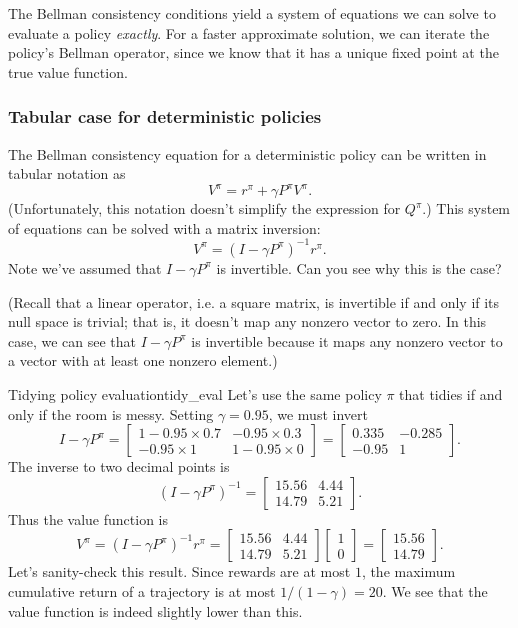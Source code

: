 \documentclass[../main/main]{subfiles}
\begin{document}
The Bellman consistency conditions yield a system of equations we can solve to evaluate a policy \emph{exactly}. For a faster approximate solution, we can iterate the policy's Bellman operator, since we know that it has a unique fixed point at the true value function.


\subsubsection{Tabular case for deterministic policies}

The Bellman consistency equation for a deterministic policy can be written in tabular notation as
\[
    V^\pi = r^\pi + \gamma P^\pi V^\pi.
\]
(Unfortunately, this notation doesn't simplify the expression for $Q^\pi$.) This system of equations can be solved with a matrix inversion:
\begin{equation}
    V^\pi = (I - \gamma P^\pi)^{-1} r^\pi. \label{eq:matrix_inversion_pe}
\end{equation}
Note we've assumed that $I - \gamma P^\pi$ is invertible. Can you see why this is the case?

(Recall that a linear operator, i.e. a square matrix, is invertible if and only if its null space is trivial; that is, it doesn't map any nonzero vector to zero. In this case, we can see that $I - \gamma P^\pi$ is invertible because it maps any nonzero vector to a vector with at least one nonzero element.)

\begin{example}{Tidying policy evaluation}{tidy_eval}
    Let's use the same policy $\pi$ that tidies if and only if the room is messy.
    Setting $\gamma = 0.95$, we must invert
    \[
        I - \gamma P^{\pi} = \begin{bmatrix} 1 - 0.95 \times 0.7 & - 0.95 \times 0.3 \\ - 0.95 \times 1 & 1 - 0.95 \times 0 \end{bmatrix} = \begin{bmatrix} 0.335 & -0.285 \\ -0.95 & 1 \end{bmatrix}.
    \]
    The inverse to two decimal points is
    \[
        (I - \gamma P^{\pi})^{-1} = \begin{bmatrix} 15.56 & 4.44 \\ 14.79 & 5.21 \end{bmatrix}.
    \]
    Thus the value function is
    \[
        V^{\pi} = (I - \gamma P^{\pi})^{-1} r^{\pi} = \begin{bmatrix} 15.56 & 4.44 \\ 14.79 & 5.21 \end{bmatrix} \begin{bmatrix} 1 \\ 0 \end{bmatrix} = \begin{bmatrix} 15.56 \\ 14.79 \end{bmatrix}.
    \]
    Let's sanity-check this result. Since rewards are at most $1$, the maximum cumulative return of a trajectory is at most $1/(1-\gamma) = 20$. We see that the value function is indeed slightly lower than this.
\end{example}
\end{document}
